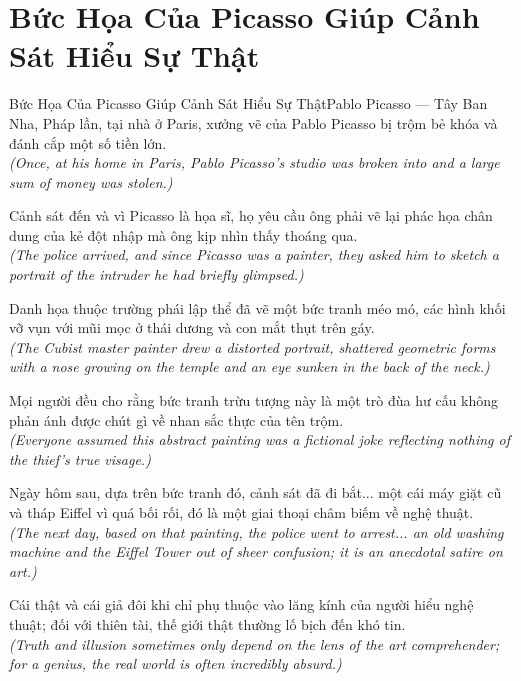 \section{Bức Họa Của Picasso Giúp Cảnh Sát Hiểu Sự Thật}
\begin{truyen}{Bức Họa Của Picasso Giúp Cảnh Sát Hiểu Sự Thật}{Pablo Picasso --- Tây Ban Nha, Pháp}
 lần, tại nhà ở Paris, xưởng vẽ của Pablo Picasso bị trộm bẻ khóa và đánh cắp một số tiền lớn.\\[4pt]
\textit{(Once, at his home in Paris, Pablo Picasso's studio was broken into and a large sum of money was stolen.)}

Cảnh sát đến và vì Picasso là họa sĩ, họ yêu cầu ông phải vẽ lại phác họa chân dung của kẻ đột nhập mà ông kịp nhìn thấy thoáng qua.\\[4pt]
\textit{(The police arrived, and since Picasso was a painter, they asked him to sketch a portrait of the intruder he had briefly glimpsed.)}

Danh họa thuộc trường phái lập thể đã vẽ một bức tranh méo mó, các hình khối vỡ vụn với mũi mọc ở thái dương và con mắt thụt trên gáy.\\[4pt]
\textit{(The Cubist master painter drew a distorted portrait, shattered geometric forms with a nose growing on the temple and an eye sunken in the back of the neck.)}

Mọi người đều cho rằng bức tranh trừu tượng này là một trò đùa hư cấu không phản ánh được chút gì về nhan sắc thực của tên trộm.\\[4pt]
\textit{(Everyone assumed this abstract painting was a fictional joke reflecting nothing of the thief's true visage.)}

Ngày hôm sau, dựa trên bức tranh đó, cảnh sát đã đi bắt... một cái máy giặt cũ và tháp Eiffel vì quá bối rối, đó là một giai thoại châm biếm về nghệ thuật.\\[4pt]
\textit{(The next day, based on that painting, the police went to arrest... an old washing machine and the Eiffel Tower out of sheer confusion; it is an anecdotal satire on art.)}

\end{truyen}
\begin{baihoc}
  Cái thật và cái giả đôi khi chỉ phụ thuộc vào lăng kính của người hiểu nghệ thuật; đối với thiên tài, thế giới thật thường lố bịch đến khó tin.\\[4pt]
  \textit{(Truth and illusion sometimes only depend on the lens of the art comprehender; for a genius, the real world is often incredibly absurd.)}
\end{baihoc}
